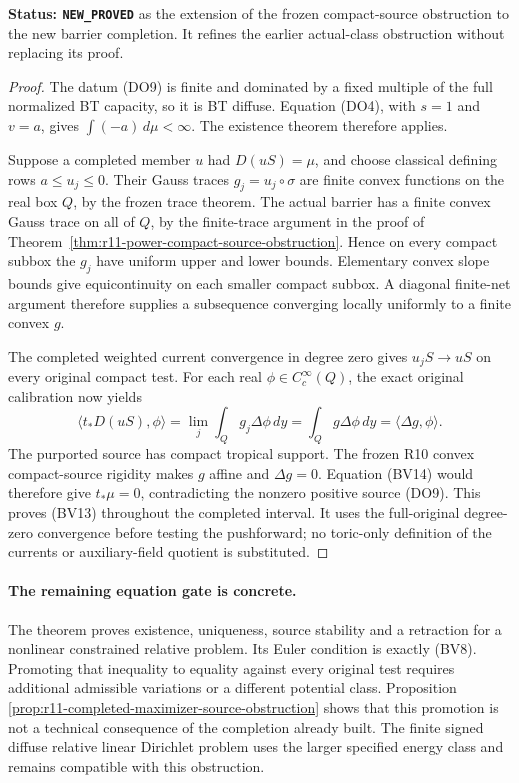 \documentclass[11pt,a4paper]{article}
\numberwithin{equation}{section}
\theoremstyle{definition}
\theoremstyle{remark}
\begin{document}
\noindent\textbf{Status: \texttt{NEW\_PROVED}}
as the extension of the frozen compact-source
obstruction to the new barrier completion.
It refines the earlier actual-class obstruction
without replacing its proof.

\begin{proof}
The datum (DO9) is finite and dominated by a
fixed multiple of the full normalized BT
capacity, so it is BT diffuse.
Equation (DO4), with $s=1$ and $v=a$,
gives $\int(-a)\,d\mu<\infty$.
The existence theorem therefore applies.

Suppose a completed member $u$ had
$D(uS)=\mu$, and choose classical defining
rows $a\leq u_j\leq0$.
Their Gauss traces $g_j=u_j\circ\sigma$
are finite convex functions on the real
box $Q$, by the frozen trace theorem.
The actual barrier has a finite convex
Gauss trace on all of $Q$, by the
finite-trace argument in the proof of
Theorem~\ref{thm:r11-power-compact-source-obstruction}.
Hence on every compact subbox the $g_j$
have uniform upper and lower bounds.
Elementary convex slope bounds give
equicontinuity on each smaller compact
subbox.  A diagonal finite-net argument
therefore supplies a subsequence converging
locally uniformly to a finite convex $g$.

The completed weighted current convergence
in degree zero gives $u_jS\to uS$ on
every original compact test.
For each real $\phi\in C_c^\infty(Q)$,
the exact original calibration now yields
\[
 \langle t_*D(uS),\phi\rangle
     =\lim_j\int_Q g_j\Delta\phi\,dy
     =\int_Q g\Delta\phi\,dy
     =\langle\Delta g,\phi\rangle.
 \tag{BV14}
\]
The purported source has compact tropical
support.  The frozen R10 convex compact-source
rigidity makes $g$ affine and $\Delta g=0$.
Equation (BV14) would therefore give
$t_*\mu=0$, contradicting the nonzero
positive source (DO9).
This proves (BV13) throughout the completed
interval.
It uses the full-original degree-zero
convergence before testing the pushforward;
no toric-only definition of the currents
or auxiliary-field quotient is substituted.
\end{proof}

\paragraph{The remaining equation gate is concrete.}
The theorem proves existence, uniqueness, source
stability and a retraction for a nonlinear
constrained relative problem.
Its Euler condition is exactly (BV8).
Promoting that inequality to equality against
every original test requires additional
admissible variations or a different potential
class.  Proposition
\ref{prop:r11-completed-maximizer-source-obstruction}
shows that this promotion is not a technical
consequence of the completion already built.
The finite signed diffuse relative linear
Dirichlet problem uses the larger specified
energy class and remains compatible with
this obstruction.
\end{document}
